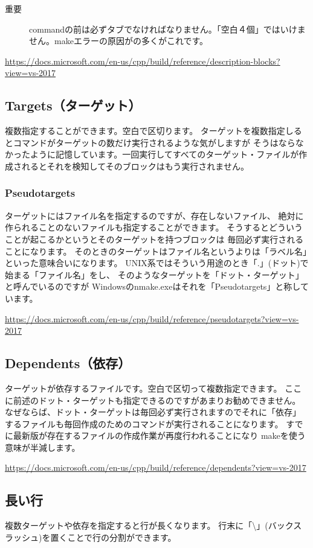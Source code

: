 \documentclass[dvipdfmx]{jsarticle}
\begin{document}
\begin{description}
\item[重要] commandの前は必ずタブでなければなりません。「空白４個」ではいけません。makeエラーの原因がの多くがこれです。
\end{description}

\url{https://docs.microsoft.com/en-us/cpp/build/reference/description-blocks?view=vs-2017}


\subsection{Targets（ターゲット）}
複数指定することができます。空白で区切ります。
ターゲットを複数指定しるとコマンドがターゲットの数だけ実行されるような気がしますが
そうはならなかったように記憶しています。一回実行してすべてのターゲット・ファイルが作成されるとそれを検知してそのブロックはもう実行されません。

\subsubsection{Pseudotargets}
ターゲットにはファイル名を指定するのですが、存在しないファイル、
絶対に作られることのないファイルも指定することができます。
そうするとどういうことが起こるかというとそのターゲットを持つブロックは
毎回必ず実行されることになります。
そのときのターゲットはファイル名というよりは「ラベル名」といった意味合いになります。
UNIX系ではそういう用途のとき「.」(ドット)で始まる「ファイル名」をし、
そのようなターゲットを「ドット・ターゲット」と呼んでいるのですが
Windowsのnmake.exeはそれを「Pseudotargets」と称しています。

\url{https://docs.microsoft.com/en-us/cpp/build/reference/pseudotargets?view=vs-2017}


\subsection{Dependents（依存）}
ターゲットが依存するファイルです。空白で区切って複数指定できます。
ここに前述のドット・ターゲットも指定できるのですがあまりお勧めできません。
なぜならば、ドット・ターゲットは毎回必ず実行されますのでそれに「依存」
するファイルも毎回作成のためのコマンドが実行されることになります。
すでに最新版が存在するファイルの作成作業が再度行われることになり
makeを使う意味が半減します。

\url{https://docs.microsoft.com/en-us/cpp/build/reference/dependents?view=vs-2017}

\subsection{長い行}
複数ターゲットや依存を指定すると行が長くなります。
行末に「\textbackslash」(バックスラッシュ)を置くことで行の分割ができます。
\end{document}
